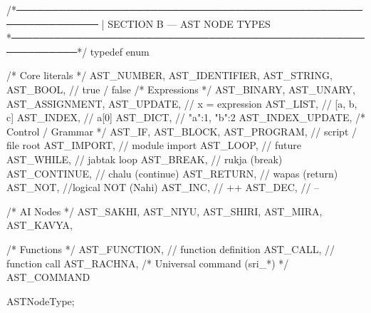 \documentclass{article}
\begin{document}
/*──────────────────────────────────────────────────────────────
 |  SECTION B — AST NODE TYPES
 *────────────────────────────────────────────────────────────*/
typedef enum {

    /* Core literals */
    AST_NUMBER,
    AST_IDENTIFIER,
    AST_STRING,
    AST_BOOL,        // true / false
    /* Expressions */
    AST_BINARY,
    AST_UNARY,
    AST_ASSIGNMENT,
    AST_UPDATE,        // x = expression
    AST_LIST,          // [a, b, c]
    AST_INDEX,         // a[0]
    AST_DICT,          // {"a":1, "b":2}
    AST_INDEX_UPDATE,
/* Control / Grammar */
    AST_IF,
    AST_BLOCK,
    AST_PROGRAM,     // script / file root
    AST_IMPORT,      // module import
    AST_LOOP,        // future
    AST_WHILE,       // jabtak loop
    AST_BREAK,       // rukja (break)
    AST_CONTINUE,    // chalu (continue)
    AST_RETURN,      // wapas (return)
    AST_NOT,    //logical NOT (Nahi)
    AST_INC,         // ++
    AST_DEC,         // --

    /* AI Nodes */
    AST_SAKHI,
    AST_NIYU,
    AST_SHIRI,
    AST_MIRA,
    AST_KAVYA,

/* Functions */
    AST_FUNCTION,      // function definition
    AST_CALL,          // function call
    AST_RACHNA,
    /* Universal command (sri_*) */
    AST_COMMAND

} ASTNodeType;
\end{document}
